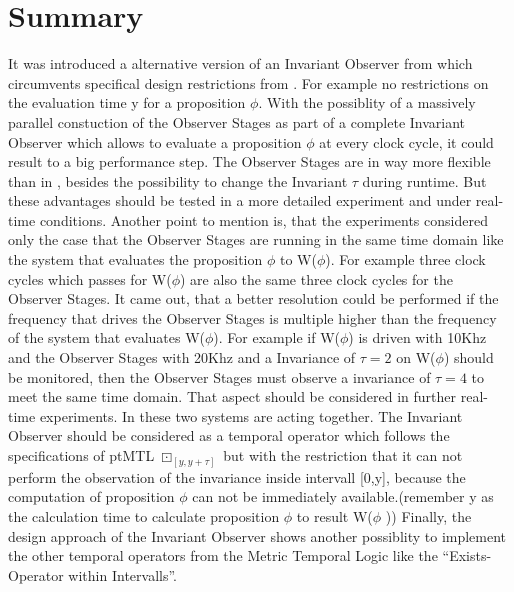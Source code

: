 \chapter{Summary}
\label{chapter:5}

\ifpdf
    \graphicspath{{Chapter3/Figs/Raster/}{Chapter3/Figs/PDF/}{Chapter3/Figs/}}
\else
    \graphicspath{{Chapter3/Figs/Vector/}{Chapter3/Figs/}}
\fi

It was introduced a alternative version of an Invariant Observer from \cite{RTFMBJ13} which circumvents specifical design restrictions from \cite{RTFMBJ13}.
For example no restrictions on the evaluation time y for a proposition $\phi$. 
With the possiblity of a massively parallel constuction of the Observer Stages as part of a complete Invariant Observer which allows to evaluate a proposition $\phi$ 
at every clock cycle, it could result to a big performance step.
The Observer Stages are in way more flexible than in \cite{RTFMBJ13}, besides the possibility to change the Invariant $\tau$ during runtime. But these advantages should be
tested in a more detailed experiment and under real-time conditions.
Another point to mention is, that the experiments considered only the case that the Observer Stages are running in the same time domain like the system that evaluates the proposition $\phi$ to W($\phi$).
For example three clock cycles which passes for W($\phi$) are also the same three clock cycles for the Observer Stages. It came out, that a better resolution could be performed if
the frequency that drives the Observer Stages is multiple higher than the frequency of the system that evaluates W($\phi$).
For example if W($\phi$) is driven with 10Khz and the Observer Stages with 20Khz and a Invariance of $\tau = 2$ on W($\phi$) should be monitored, then the Observer Stages must observe a invariance
of $\tau = 4$ to meet the same time domain. That aspect should be considered in further real-time experiments. 
In \cite{RTFMBJ13} these two systems are acting together.
The Invariant Observer should be considered as a temporal operator which follows the specifications of ptMTL $\boxdot _{[ y,y+\tau ]}$ but with the restriction that it can not perform the observation of the 
invariance inside intervall [0,y], because the computation of proposition $\phi$ can not be immediately available.(remember y as the calculation time to calculate proposition $\phi$ to result W($\phi$ ))
Finally, the design approach of the Invariant Observer shows another possiblity to implement the other temporal operators from the Metric Temporal Logic like the ``Exists-Operator within Intervalls''.




